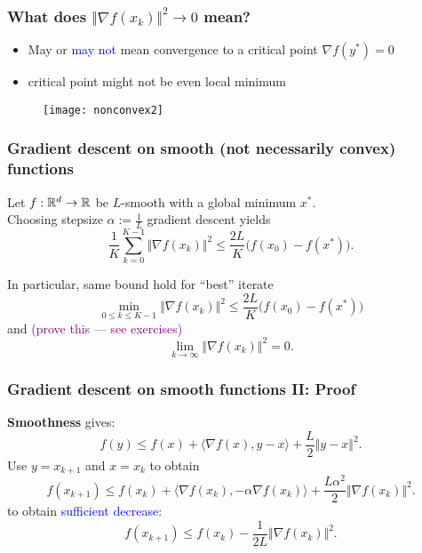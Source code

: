 \documentclass[aspectratio=149]{beamer}
\begin{document}
\begin{frame}
  \frametitle{What does $\Vert \nabla f(x_k) \Vert^2\to 0$ mean?}
  \begin{itemize}
    \item May or \textcolor{blue}{may not} mean convergence to a critical point $\nabla f(y^*) =0$
    \item critical point might not be even local minimum
  \end{itemize}

  \begin{figure}[ht]
    \centering
    \texttt{[image: nonconvex2]}
  \end{figure}
\end{frame}


\begin{frame}
  \frametitle{Gradient descent on smooth (not necessarily convex) functions}

  \begin{theorem}
    Let $f : \mathbb{R}^d \to \mathbb{R}$ be $L$-smooth with a global minimum $x^*$. \\
    Choosing stepsize $\alpha := \frac{1}{L}$ gradient descent yields
    \begin{equation}
      \frac{1}{K} \sum_{k=0}^{K-1} \Vert \nabla f(x_k) \Vert^2 \le \frac{2L}{K} \big(f(x_0) - f(x^*)\big).
    \end{equation}
  \end{theorem}
  In particular, same bound hold for ``best'' iterate
  \begin{equation}
    \min_{0\le k \le K-1} \Vert \nabla f(x_k) \Vert^2 \le \frac{2L}{K} \big(f(x_0)-f(x^*)\big)
  \end{equation}
  and \textcolor{purple}{(prove this --- see exercises)}
  \begin{equation}
    \lim_{k \to \infty} \Vert \nabla f(x_k) \Vert^2 = 0.
  \end{equation}
\end{frame}


\begin{frame}
  \frametitle{Gradient descent on smooth  functions II: Proof}

  \textbf{Smoothness} gives:
  \begin{equation}
    f(y) \le f(x) + \langle \nabla f(x), y- x \rangle + \frac{L}{2} \Vert y-x \Vert^2.
  \end{equation}
  Use $y=x_{k+1}$ and $x=x_k$ to obtain
  \begin{equation}
    f(x_{k+1}) \le f(x_k) + \langle \nabla f(x_k), - \alpha \nabla f(x_k) \rangle + \frac{L \alpha^2}{2} \Vert \nabla f(x_k) \Vert^2.
  \end{equation}
  to obtain \textcolor{blue}{sufficient decrease:}
  \begin{equation}
    f(x_{k+1}) \le f(x_k) - \frac{1}{2L} \Vert \nabla f(x_k) \Vert^2.
  \end{equation}
\end{frame}
\end{document}
